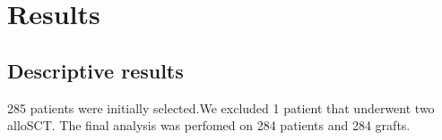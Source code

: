 \documentclass[a4paper,11pt] {article}
\begin{document}




\pagebreak[4]
\section{Results}





\subsection{Descriptive results}
 285 patients were initially selected.We excluded 1 patient that underwent two alloSCT. The final analysis was perfomed on 284 patients and 284 grafts.
\end{document}
